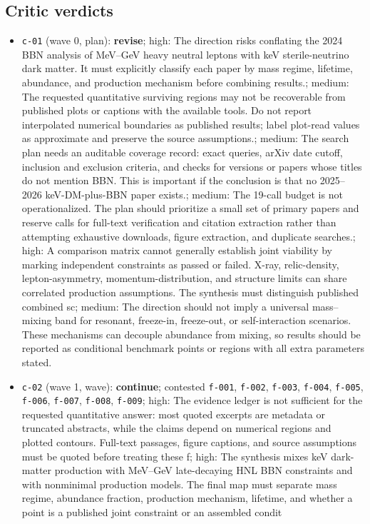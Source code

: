 \documentclass[11pt,a4paper]{article}
\begin{document}
\subsection{Critic verdicts}
\begin{itemize}
  \item \texttt{c-01} (wave 0, plan): \textbf{revise}; high: The direction risks conflating the 2024 BBN analysis of MeV--GeV heavy neutral leptons with keV sterile-neutrino dark matter. It must explicitly classify each paper by mass regime, lifetime, abundance, and production mechanism before combining results.; medium: The requested quantitative surviving regions may not be recoverable from published plots or captions with the available tools. Do not report interpolated numerical boundaries as published results; label plot-read values as approximate and preserve the source assumptions.; medium: The search plan needs an auditable coverage record: exact queries, arXiv date cutoff, inclusion and exclusion criteria, and checks for versions or papers whose titles do not mention BBN. This is important if the conclusion is that no 2025--2026 keV-DM-plus-BBN paper exists.; medium: The 19-call budget is not operationalized. The plan should prioritize a small set of primary papers and reserve calls for full-text verification and citation extraction rather than attempting exhaustive downloads, figure extraction, and duplicate searches.; high: A comparison matrix cannot generally establish joint viability by marking independent constraints as passed or failed. X-ray, relic-density, lepton-asymmetry, momentum-distribution, and structure limits can share correlated production assumptions. The synthesis must distinguish published combined sc; medium: The direction should not imply a universal mass--mixing band for resonant, freeze-in, freeze-out, or self-interaction scenarios. These mechanisms can decouple abundance from mixing, so results should be reported as conditional benchmark points or regions with all extra parameters stated.
  \item \texttt{c-02} (wave 1, wave): \textbf{continue}; contested \texttt{f-001}, \texttt{f-002}, \texttt{f-003}, \texttt{f-004}, \texttt{f-005}, \texttt{f-006}, \texttt{f-007}, \texttt{f-008}, \texttt{f-009}; high: The evidence ledger is not sufficient for the requested quantitative answer: most quoted excerpts are metadata or truncated abstracts, while the claims depend on numerical regions and plotted contours. Full-text passages, figure captions, and source assumptions must be quoted before treating these f; high: The synthesis mixes keV dark-matter production with MeV--GeV late-decaying HNL BBN constraints and with nonminimal production models. The final map must separate mass regime, abundance fraction, production mechanism, lifetime, and whether a point is a published joint constraint or an assembled condit

\end{itemize}
\end{document}
